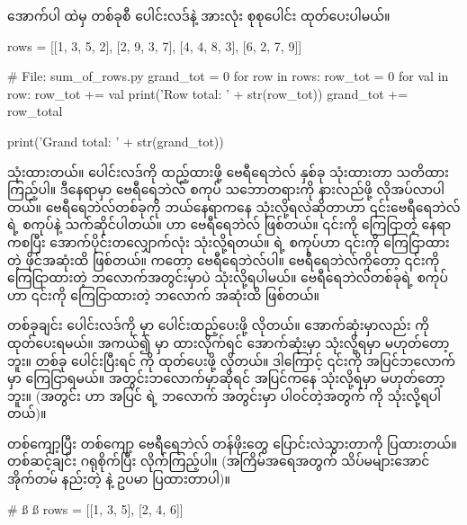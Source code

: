 အောက်ပါ  ထဲမှ   တစ်ခုစီ ပေါင်းလဒ်နဲ့  အားလုံး စုစုပေါင်း  ထုတ်ပေးပါမယ်။
\begin{codetxt}
rows = [[1, 3, 5, 2],
        [2, 9, 3, 7],
        [4, 4, 8, 3],
        [6, 2, 7, 9]]
\end{codetxt}
\betweenminted{\medskipamount}
%
\begin{py}
# File: sum_of_rows.py
grand_tot = 0
for row in rows:
    row_tot = 0
    for val in row:
        row_tot += val
    print('Row total: ' + str(row_tot))
    grand_tot += row_total

print('Grand total: ' + str(grand_tot))
\end{py}
%
   သုံးထားတယ်။ ပေါင်းလဒ်ကို ထည့်ထားဖို့ ဗေရီရေဘဲလ် နှစ်ခု သုံးထားတာ သတိထားကြည့်ပါ။ ဒီနေရာမှာ ဗေရီရေဘဲလ် စကုပ်  သဘောတရားကို နားလည်ဖို့ လိုအပ်လာပါတယ်။ ဗေရီရေဘဲလ်တစ်ခုကို ဘယ်နေရာကနေ သုံးလို့ရလဲဆိုတာဟာ ၎င်းဗေရီရေဘဲလ်ရဲ့ စကုပ်နဲ့ သက်ဆိုင်ပါတယ်။  ဟာ  ဗေရီရေဘဲလ် ဖြစ်တယ်။ ၎င်းကို ကြေငြာတဲ့ နေရာကစပြီး အောက်ပိုင်းတလျှောက်လုံး သုံးလို့ရတယ်။  ရဲ့ စကုပ်ဟာ  ၎င်းကို ကြေငြာထားတဲ့ ဖိုင်အဆုံးထိ ဖြစ်တယ်။  ကတော့  ဗေရီရေဘဲလ်ပါ။  ဗေရီရေဘဲလ်ကိုတော့ ၎င်းကို ကြေငြာထားတဲ့ ဘလောက်အတွင်းမှာပဲ သုံးလို့ရပါမယ်။  ဗေရီရေဘဲလ်တစ်ခုရဲ့ စကုပ်ဟာ ၎င်းကို ကြေငြာထားတဲ့ ဘလောက် အဆုံးထိ ဖြစ်တယ်။

 တစ်ခုချင်း ပေါင်းလဒ်ကို  မှာ ပေါင်းထည့်ပေးဖို့ လိုတယ်။ အောက်ဆုံးမှာလည်း  ကို  ထုတ်ပေးရမယ်။ အကယ်၍  မှာ ထားလိုက်ရင် အောက်ဆုံးမှာ သုံးလို့ရမှာ မဟုတ်တော့ဘူး။  တစ်ခု ပေါင်းပြီးရင်  ကို ထုတ်ပေးဖို့ လိုတယ်။ ဒါကြောင့် ၎င်းကို အပြင်ဘလောက်မှာ ကြေငြာရမယ်။ အတွင်းဘလောက်မှာဆိုရင် အပြင်ကနေ သုံးလို့ရမှာ မဟုတ်တော့ဘူး။ (အတွင်း   ဟာ အပြင်   ရဲ့ ဘလောက် အတွင်းမှာ ပါဝင်တဲ့အတွက်  ကို သုံးလို့ရပါတယ်)။


 တစ်ကျော့ပြီး တစ်ကျော့ ဗေရီရေဘဲလ် တန်ဖိုးတွေ ပြောင်းလဲသွားတာကို ပြထားတယ်။ တစ်ဆင့်ချင်း ဂရုစိုက်ပြီး လိုက်ကြည့်ပါ။ (အကြိမ်အရေအတွက် သိပ်မများအောင် အိုက်တမ် နည်းတဲ့  နဲ့ ဥပမာ ပြထားတာပါ)။
%
\begin{py}
# ß  ß
rows = [[1, 3, 5],
        [2, 4, 6]]
\end{py}
%

